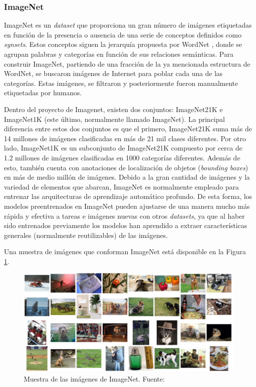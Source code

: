 \subsubsection{ImageNet}
ImageNet \cite{imagenet_cvpr09, ILSVRC15} es un \textit{dataset} que proporciona un gran número de imágenes etiquetadas en función de la presencia o ausencia de una serie de conceptos definidos como \textit{synsets}. Estos conceptos siguen la jerarquía propuesta por WordNet \cite{wordnet}, donde se agrupan palabras y categorías en función de sus relaciones semánticas. Para construir ImageNet, partiendo de una fracción de la ya mencionada estructura de WordNet, se buscaron imágenes de Internet para poblar cada una de las categorías. Estas imágenes, se filtraron y posteriormente fueron manualmente etiquetadas por humanos. 

Dentro del proyecto de Imagenet, existen dos conjuntos: ImageNet21K e ImageNet1K (este último, normalmente llamado ImageNet). La principal diferencia entre estos dos conjuntos es que el primero, ImageNet21K suma más de 14 millones de imágenes clasificadas en más de 21 mil clases diferentes. Por otro lado, ImageNet1K es un subconjunto de ImageNet21K compuesto por cerca de 1.2 millones de imágenes clasificadas en 1000 categorías diferentes. Además de esto, también cuenta con anotaciones de localización de objetos (\textit{bounding boxes}) en más de medio millón de imágenes. Debido a la gran cantidad de imágenes y la variedad de elementos que abarcan, ImageNet es normalmente empleado para entrenar las arquitecturas de aprendizaje automático profundo. De esta forma, los modelos preentrenados en ImageNet pueden ajustarse de una manera mucho más rápida y efectiva a tareas e imágenes nuevas con otros \textit{datasets}, ya que al haber sido entrenados previamente los modelos han aprendido a extraer características generales (normalmente reutilizables) de las imágenes.

Una muestra de imágenes que conforman ImageNet está disponible en la Figura \ref{fig:imagenet}.
\begin{figure}[H]
\centering
\includegraphics[width=\textwidth]{imagenes/imagenet.png}
\caption{Muestra de las imágenes de ImageNet. Fuente: \cite{ILSVRC15}}
\label{fig:imagenet}
\end{figure}


